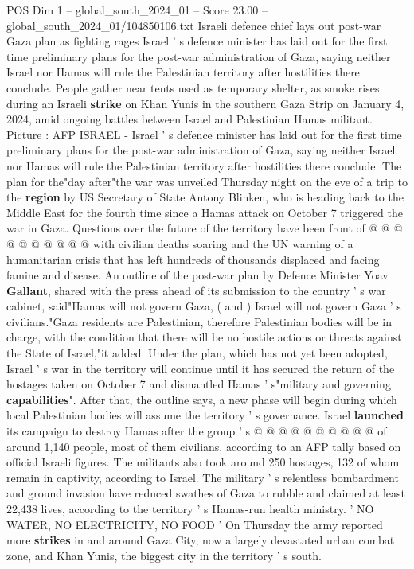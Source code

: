 \begin{textsample}{POS Dim 1 – global\_south\_2024\_01 – Score 23.00 – global\_south\_2024\_01/104850106.txt}  \label{ex:f1_pos_107}
Israeli defence chief lays out post-war Gaza plan as fighting rages Israel ' s defence minister has laid out for the first time preliminary plans for the post-war administration of Gaza, saying neither Israel nor Hamas will rule the Palestinian territory after hostilities there conclude.
People gather near tents used as temporary shelter, as smoke rises during an Israeli \textbf{strike} on Khan Yunis in the southern Gaza Strip on January 4, 2024, amid ongoing battles between Israel and Palestinian Hamas militant.
Picture : AFP ISRAEL - Israel ' s defence minister has laid out for the first time preliminary plans for the post-war administration of Gaza, saying neither Israel nor Hamas will rule the Palestinian territory after hostilities there conclude.
The plan for the"day after"the war was unveiled Thursday night on the eve of a trip to the \textbf{region} by US Secretary of State Antony Blinken, who is heading back to the Middle East for the fourth time since a Hamas attack on October 7 triggered the war in Gaza.
Questions over the future of the territory have been front of @ @ @ @ @ @ @ @ @ @ with civilian deaths soaring and the UN warning of a humanitarian crisis that has left hundreds of thousands displaced and facing famine and disease.
An outline of the post-war plan by Defence Minister Yoav \textbf{Gallant}, shared with the press ahead of its submission to the country ' s war cabinet, said"Hamas will not govern Gaza, ( and ) Israel will not govern Gaza ' s civilians."Gaza residents are Palestinian, therefore Palestinian bodies will be in charge, with the condition that there will be no hostile actions or threats against the State of Israel,"it added.
Under the plan, which has not yet been adopted, Israel ' s war in the territory will continue until it has secured the return of the hostages taken on October 7 and dismantled Hamas ' s"military and governing \textbf{capabilities}".
After that, the outline says, a new phase will begin during which local Palestinian bodies will assume the territory ' s governance.
Israel \textbf{launched} its campaign to destroy Hamas after the group ' s @ @ @ @ @ @ @ @ @ @ of around 1,140 people, most of them civilians, according to an AFP tally based on official Israeli figures.
The militants also took around 250 hostages, 132 of whom remain in captivity, according to Israel.
The military ' s relentless bombardment and ground invasion have reduced swathes of Gaza to rubble and claimed at least 22,438 lives, according to the territory ' s Hamas-run health ministry. ' NO WATER, NO ELECTRICITY, NO FOOD ' On Thursday the army reported more \textbf{strikes} in and around Gaza City, now a largely devastated urban combat zone, and Khan Yunis, the biggest city in the territory ' s south.

\end{textsample}
